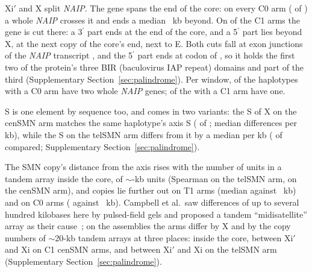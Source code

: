 \documentclass[10pt]{article}
\begin{document}
Xi$'$ and X split \emph{NAIP}. The gene spans the end of the core: on every C0 arm (\elNaipWholeCZero{} of \elCZero) a whole \emph{NAIP} crosses it and ends a median \elNaipPast~kb beyond. On \elNaipSplit{} of the \elCOne{} C1 arms the gene is cut there: a 3$^\prime$ part ends at the end of the core, and a 5$^\prime$ part lies beyond X, at the next copy of the core's end, next to E. Both cuts fall at exon junctions of the \emph{NAIP} transcript \nxTx{}, and the 5$^\prime$ part ends at codon \nxFiveCodon{} of \nxCodons, so it holds the first two of the protein's three BIR (baculovirus IAP repeat) domains and part of the third (Supplementary Section~\ref{sec:palindrome}). Per window, \elNaipTwoWholeCZero{} of the \elCZero{} haplotypes with a C0 arm have two whole \emph{NAIP} genes; \elNaipOneWholeCOne{} of the \elCOne{} with a C1 arm have one.

S is one element by sequence too, and comes in two variants: the S of X on the cenSMN arm matches the same haplotype's axis S (\sCenSa{} of \sCenAll; median \sSaMed{} differences per kb), while the S on the telSMN arm differs from it by a median \sStMed{} per kb (\sTelSt{} of \sTelAll{} compared; Supplementary Section~\ref{sec:palindrome}).

The SMN copy's distance from the axis rises with the number of units in a tandem array inside the core, of $\sim$\elInnerUnit-kb units (Spearman \elRhotel{} on the telSMN arm, \elRhocen{} on the cenSMN arm), and copies lie further out on T1 arms (median \elCopyDTOne{} against \elCopyDTZero~kb) and on C0 arms (\elCopyDCZero{} against \elCopyDCOne~kb). Campbell et al.\ saw differences of up to several hundred kilobases here by pulsed-field gels and proposed a tandem ``midisatellite'' array as their cause~\cite{campbell1997}; on the assemblies the arms differ by X and by the copy numbers of $\sim$20-kb tandem arrays at three places: inside the core, between Xi$'$ and Xi on C1 cenSMN arms, and between Xi$'$ and Xi on the telSMN arm (Supplementary Section~\ref{sec:palindrome}).
\end{document}
